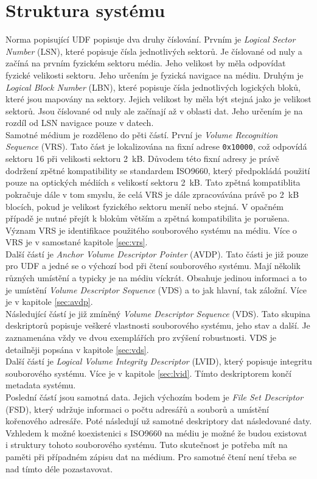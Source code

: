 \section{Struktura systému}
Norma popisující UDF popisuje dva druhy číslování. Prvním je \textit{Logical Sector Number} (LSN), které popisuje čísla jednotlivých sektorů. Je číslované od nuly a začíná na prvním fyzickém sektoru média. Jeho velikost by měla odpovídat fyzické velikosti sektoru. Jeho určením je fyzická navigace na médiu. Druhým je \textit{Logical Block Number} (LBN), které popisuje čísla jednotlivých logických bloků, které jsou mapovány na sektory. Jejich velikost by měla být stejná jako je velikost sektorů. Jsou číslované od nuly ale začínají až v oblasti dat. Jeho určením je na rozdíl od LSN navigace pouze v datech.\\
Samotné médium je rozděleno do pěti částí. První je \textit{Volume Recognition Sequence} (VRS). Tato část je lokalizována na fixní adrese \texttt{0x10000}, což odpovídá sektoru 16 při velikosti sektoru 2~kB. Důvodem této fixní adresy je právě dodržení zpětné kompatibility se standardem ISO9660, který předpokládá použití pouze na optických médiích s velikostí sektoru 2~kB. Tato zpětná kompatiblita pokračuje dále v tom smyslu, že celá VRS je dále zpracovávána právě po 2~kB blocích, pokud je velikost fyzického sektoru menší nebo stejná. V opačném případě je nutné přejít k blokům větším a zpětná kompatibilita je porušena. Význam VRS je identifikace použitého souborového systému na médiu. Více o VRS je v samostané kapitole \ref{sec:vrs}.\\
Další částí je \textit{Anchor Volume Descriptor Pointer} (AVDP). Tato části je již pouze pro UDF a jedné se o výchozí bod při čtení souborového systému. Mají několik různých umístění a typicky je na médiu víckrát. Obsahuje jedinou informaci a to je umístění \textit{Volume Descriptor Sequence} (VDS) a to jak hlavní, tak záložní. Více je v kapitole \ref{sec:avdp}.\\
Následující částí je již zmíněný \textit{Volume Descriptor Sequence} (VDS). Tato skupina deskriptorů popisuje veškeré vlastnosti souborového systému, jeho stav a další. Je zaznamenána vždy ve dvou exemplářích pro zvýšení robustnosti. VDS je detailněji popsána v kapitole \ref{sec:vds}.\\
Další částí je \textit{Logical Volume Integrity Descriptor} (LVID), který popisuje integritu souborového systému. Více je v kapitole \ref{sec:lvid}. Tímto deskriptorem končí metadata systému.\\
Poslední částí jsou samotná data. Jejich výchozím bodem je \textit{File Set Descriptor} (FSD), který udržuje informaci o počtu adresářů a souborů a umístění kořenového adresáře. Poté následují už samotné deskriptory dat následované daty.\\
Vzhledem k možné koexistenici s ISO9660 na médiu je možné že budou existovat i struktury tohoto souborového systému. Tuto skutečnost je potřeba mít na paměti při případném zápisu dat na médium. Pro samotné čtení není třeba se nad tímto déle pozastavovat.


